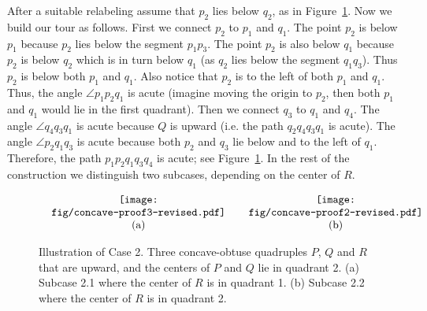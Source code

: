 \documentclass[11pt,letter]{article}
\begin{document}
After a suitable relabeling assume that $p_2$ lies below $q_2$, as in Figure~\ref{proof-fig2}. Now we build our tour as follows. First we connect $p_2$ to $p_1$ and $q_1$. The point $p_2$ is below $p_1$ because $p_2$ lies below the segment $p_1p_3$. The point $p_2$ is also below $q_1$ because $p_2$ is below $q_2$ which is in turn below $q_1$ (as $q_2$ lies below the segment $q_1q_3$). Thus $p_2$ is below both $p_1$ and $q_1$. Also notice that $p_2$ is to the left of both $p_1$ and $q_1$. Thus, the angle $\angle p_1p_2q_1$ is acute (imagine moving the origin to $p_2$, then both $p_1$ and $q_1$ would lie in the first quadrant).
Then we connect $q_3$ to $q_1$ and $q_4$. The angle $\angle q_4q_3q_1$ is acute because $Q$ is upward (i.e. the path $q_2q_4q_3q_1$ is acute). The angle $\angle p_2q_1q_3$ is acute because both $p_2$ and $q_3$ lie below and to the left of $q_1$. Therefore, the path $p_1p_2q_1q_3q_4$ is acute; see Figure~\ref{proof-fig2}.
In the rest of the construction we distinguish two subcases, depending on the center of $R$.  


\begin{figure}[htb]
	\centering
	\setlength{\tabcolsep}{0in}
	$\begin{tabular}{cc}
		\multicolumn{1}{m{.5\columnwidth}}{\centering\vspace{0pt}\texttt{[image: fig/concave-proof3-revised.pdf]}}
		&\multicolumn{1}{m{.5\columnwidth}}{\centering\vspace{0pt}\texttt{[image: fig/concave-proof2-revised.pdf]}}
		\\
		(a)   &(b) 
	\end{tabular}$
	\caption{Illustration of Case 2. Three concave-obtuse quadruples $P$, $Q$ and $R$ that are upward, and the centers of $P$ and $Q$ lie in quadrant 2. (a) Subcase 2.1 where the center of $R$ is in quadrant 1. (b) Subcase 2.2 where the center of $R$ is in quadrant 2.}
	\label{proof-fig2}
\end{figure}
\end{document}
